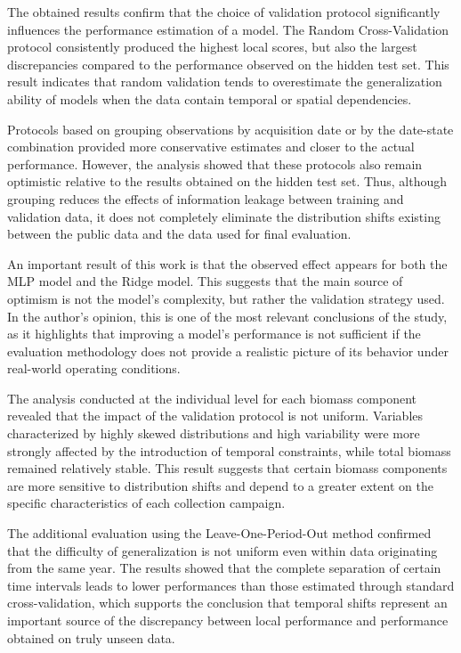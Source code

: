 The obtained results confirm that the choice of validation protocol significantly influences the performance estimation of a model. The Random Cross-Validation protocol consistently produced the highest local scores, but also the largest discrepancies compared to the performance observed on the hidden test set. This result indicates that random validation tends to overestimate the generalization ability of models when the data contain temporal or spatial dependencies.

Protocols based on grouping observations by acquisition date or by the date-state combination provided more conservative estimates and closer to the actual performance. However, the analysis showed that these protocols also remain optimistic relative to the results obtained on the hidden test set. Thus, although grouping reduces the effects of information leakage between training and validation data, it does not completely eliminate the distribution shifts existing between the public data and the data used for final evaluation.

An important result of this work is that the observed effect appears for both the MLP model and the Ridge model. This suggests that the main source of optimism is not the model's complexity, but rather the validation strategy used. In the author's opinion, this is one of the most relevant conclusions of the study, as it highlights that improving a model's performance is not sufficient if the evaluation methodology does not provide a realistic picture of its behavior under real-world operating conditions.

The analysis conducted at the individual level for each biomass component revealed that the impact of the validation protocol is not uniform. Variables characterized by highly skewed distributions and high variability were more strongly affected by the introduction of temporal constraints, while total biomass remained relatively stable. This result suggests that certain biomass components are more sensitive to distribution shifts and depend to a greater extent on the specific characteristics of each collection campaign.

The additional evaluation using the Leave-One-Period-Out method confirmed that the difficulty of generalization is not uniform even within data originating from the same year. The results showed that the complete separation of certain time intervals leads to lower performances than those estimated through standard cross-validation, which supports the conclusion that temporal shifts represent an important source of the discrepancy between local performance and performance obtained on truly unseen data.

